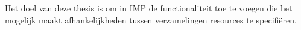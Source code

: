 Het doel van deze thesis is om in IMP de functionaliteit toe te voegen die het mogelijk maakt afhankelijkheden tussen verzamelingen resources te specifi\"eren.


